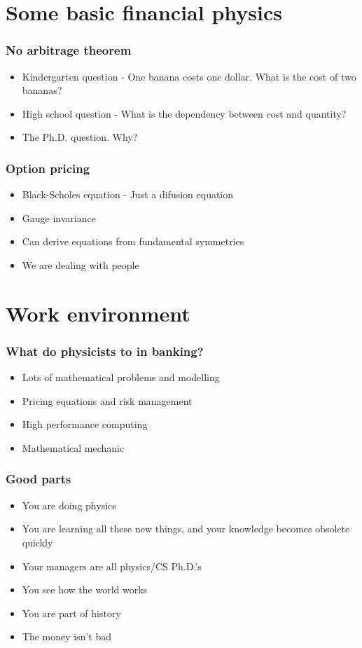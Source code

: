 \documentclass{beamer}
\begin{document}
\section{Some basic financial physics}

\begin{frame}\frametitle{No arbitrage theorem}
  \begin{itemize}
\item Kindergarten question - One banana costs one dollar.  What
  is the cost of two bananas?
\item High school question - What is the dependency between cost
  and quantity?
\item The Ph.D. question.  Why?
  \end{itemize}
\end{frame}

\begin{frame}\frametitle{Option pricing}
  \begin{itemize}
\item Black-Scholes equation - Just a difusion equation
\item Gauge invariance
\item Can derive equations from fundamental symmetries
\item We are dealing with people
    \end{itemize}
\end{frame}
 
\section{Work environment}
\begin{frame}\frametitle{What do physicists to in banking?}
    \begin{itemize}
\item Lots of mathematical problems and modelling
\item Pricing equations and risk management
\item High performance computing
\item Mathematical mechanic
    \end{itemize}  
\end{frame}

\begin{frame}\frametitle{Good parts}
    \begin{itemize}
\item You are doing physics
\item You are learning all these new things, and your knowledge
  becomes obsolete quickly
\item Your managers are all physics/CS Ph.D.'s
\item You see how the world works
\item You are part of history
\item The money isn't bad
    \end{itemize}    
\end{frame}
\end{document}
